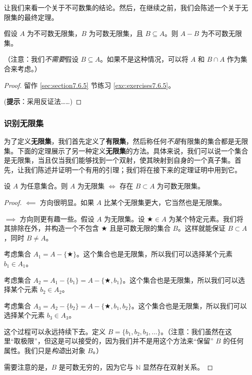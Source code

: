 让我们来看一个关于不可数集的结论。然后，在继续之前，我们会陈述一个关于无限集的最终定理。

\begin{lemma}\label{lemma7.6.29}
    假设 $A$ 为不可数无限集，$B$ 为可数无限集，且 $B \subseteq A$。则 $A-B$ 为不可数无限集。
\end{lemma}

（注意：我们\emph{不需要}假设 $B \subseteq A$。如果不是这种情况，可以将 $A$ 和 $B \cap A$ 作为集合来考虑。）

\begin{proof}
    留作 \ref{sec:section7.6.5} 节练习 \ref{exc:exercises7.6.5}。

    (\textbf{提示}：采用反证法……)
\end{proof}

\subsubsection*{识别无限集}

为了定义\textbf{无限集}，我们首先定义了\textbf{有限集}，然后称任何\emph{不是}有限集的集合都是无限集。下面的定理展示了另一种定义\textbf{无限集}的方法。具体来说，我们可以说一个集合是无限集，当且仅当我们能够找到一个双射，使其映射到自身的一个真子集。首先，让我们陈述并证明一个有用的引理；我们将在接下来的定理证明中用到它。

\begin{lemma}\label{lemma7.6.30}
    设 $A$ 为任意集合。则 $A$ 为无限集 $\iff$ 存在 $B \subset A$ 为可数无限集。
\end{lemma}

\begin{proof}
    $\impliedby$ 方向很明显。如果 $A$ 比某个无限集更大，它当然也是无限集。

    $\implies$ 方向则更有趣一些。假设 $A$ 为无限集。设 $\bigstar \in A$ 为某个特定元素。我们将其排除在外，并构造一个不包含 $\bigstar$ 且是可数无限的集合 $B$。这样就能保证 $B \subset A$，同时 $B \ne A$。

    考虑集合 $A_1 = A - \{\bigstar\}$。这个集合也是无限集，所以我们可以选择某个元素 $b_1 \in A_1$。

    考虑集合 $A_2 = A_1- \{b_1\} = A - \{\bigstar, b_1\}$。这个集合也是无限集，所以我们可以选择某个元素 $b_2 \in A_2$。

    考虑集合 $A_3 = A_2- \{b_2\} = A - \{\bigstar, b_1, b_2\}$。这个集合也是无限集，所以我们可以选择某个元素 $b_3 \in A_3$。

    这个过程可以永远持续下去。定义 $B = \{b_1, b_2, b_3, \dots\}$。（注意：我们虽然在这里``取极限''，但这是可以接受的，因为我们并不是用这个方法来``保留'' $B$ 的任何属性。我们只是\emph{构造}出对象 $B$。）

    需要注意的是，$B$ 是可数无穷的，因为它与 $\mathbb{N}$ 显然存在双射关系。
\end{proof}

